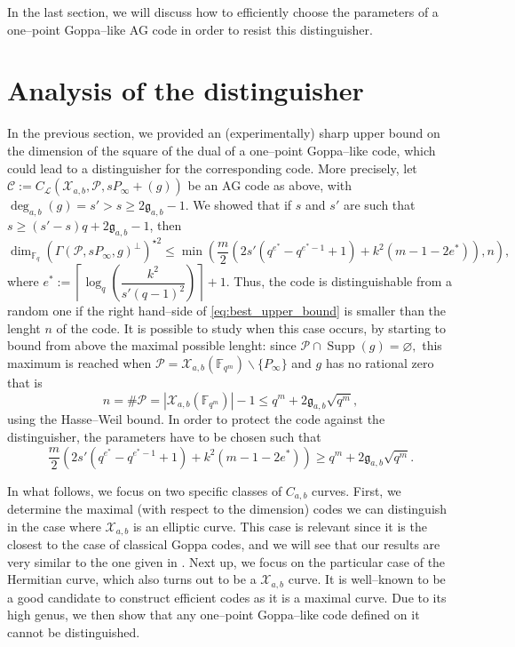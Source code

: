 \documentclass[lettersize,journal]{IEEEtran}
\theoremstyle{plain}
\theoremstyle{definition}
\theoremstyle{remark}
\newcommand{\calP}{\mathcal{P}}
\newcommand{\calL}{\mathcal{L}}
\newcommand{\calC}{\mathcal{C}}
\newcommand{\calX}{\mathcal{X}}
\newcommand{\fqm}{\mathbb{F}_{q^m}}
\newcommand{\fq}{\mathbb{F}_{q}}
\newcommand{\Supp}{\operatorname{Supp}}
\newcommand{\degab}[1]{\deg_{a,b}\left(#1\right)}
\begin{document}
	In the last section, we will discuss how to efficiently choose the parameters of a one--point Goppa--like AG code in order to resist this distinguisher.
	
	\section{Analysis of the distinguisher}\label{sec:analysis}
	
	In the previous section, we provided an (experimentally) sharp upper bound on the dimension of the square of the dual of a one--point Goppa--like code, which could lead to a distinguisher for the corresponding code. More precisely, let $\calC := C_\calL(\calX_{a,b},\calP,sP_\infty +(g))$ be an AG code as above, with $\degab{g} = s'>s\geq 2\mathfrak{g}_{a,b}-1$. We showed that if $s$ and $s'$ are such that $s \geq (s'-s)q+2\mathfrak{g}_{a,b}-1$, then
	\begin{equation} \label{eq:best_upper_bound}
		\dim_{\fq} (\Gamma(\calP,sP_\infty,g)^{\perp})^{\star 2} \leq \min \left(\frac{m}{2}\left(2s'(q^{e^*}-q^{e^*-1}+1)+k^2(m-1-2e^*)  \right),n\right),
	\end{equation}
	where $e^* := \left\lceil \log_q\left(\dfrac{k^2}{s'(q-1)^2}\right)\right\rceil+1$. Thus, the code is distinguishable from a random one if the right hand--side of \eqref{eq:best_upper_bound} is smaller than the lenght $n$ of the code. It is possible to study when this case occurs, by starting to bound from above the maximal possible lenght: since $\calP \cap \Supp(g) = \varnothing,$ this maximum is reached when $\calP = \calX_{a,b}(\fqm) \backslash \{P_\infty\}$ and $g$ has no rational zero that is
	$$n = \# \calP = |\calX_{a,b}(\fqm)|-1 \leq q^m+2\mathfrak{g}_{a,b}\sqrt{q^m},$$
	using the Hasse--Weil bound. In order to protect the code against the distinguisher, the parameters have to be chosen such that 
	\begin{equation} \label{eq:cond_not_to_distinguish}
		\frac{m}{2}\left(2s'(q^{e^*}-q^{e^*-1}+1)+k^2(m-1-2e^*)  \right)\geq q^m+2\mathfrak{g}_{a,b}\sqrt{q^m}.
	\end{equation}
	
	In what follows, we focus on two specific classes of $C_{a,b}$ curves. First, we determine the maximal (with respect to the dimension) codes we can distinguish in the case where $\calX_{a,b}$ is an elliptic curve. This case is relevant since it is the closest to the case of classical Goppa codes, and we will see that our results are very similar to the one given in \cite{MT21}. Next up, we focus on the particular case of the Hermitian curve, which also turns out to be a $\calX_{a,b}$ curve. It is well--known to be a good candidate to construct efficient codes as it is a maximal curve. Due to its high genus, we then show that any one--point Goppa--like code defined on it cannot be distinguished.
	
\end{document}
